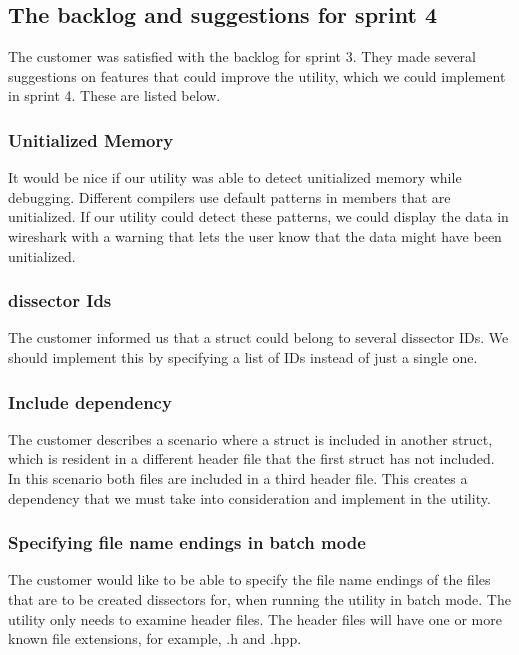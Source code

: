 \subsection{The backlog and suggestions for sprint 4}
The customer was satisfied with the backlog for sprint 3.
They made several suggestions on features that could improve the \gls{utility}, which we could implement in sprint 4.
These are listed below.

\subsubsection{Unitialized Memory}
It would be nice if our \gls{utility} was able to detect unitialized memory while debugging.
Different compilers use default patterns in \glspl{member} that are unitialized. If our \gls{utility} could detect these patterns,
we could display the data in \Gls{wireshark} with a warning that lets the user know that the data might have been unitialized.

\subsubsection{\Gls{dissector} Ids}
The customer informed us that a \gls{struct} could belong to several \gls{dissector} IDs.
We should implement this by specifying a list of IDs instead of just a single one.

\subsubsection{Include dependency}
The customer describes a scenario where a \gls{struct} is included in another \gls{struct}, which is resident in a different \gls{header} file
that the first \gls{struct} has not included. In this scenario both files are included in a third \gls{header} file.
This creates a dependency that we must take into consideration and implement in the \gls{utility}.

\subsubsection{Specifying file name endings in \gls{batch mode}}
The customer would like to be able to specify the file name endings of the files that are to be created \glspl{dissector} for,
when running the \gls{utility} in \gls{batch mode}. The \gls{utility} only needs to examine \gls{header} files. The \gls{header} files will have one or more known
file extensions, for example, .h and .hpp.

